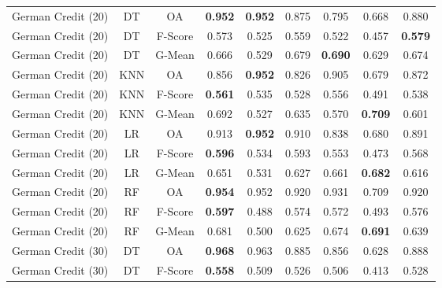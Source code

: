 \begin{longtable}{ccccccccc}
German Credit (20) &         DT &      OA & \textbf{0.952} & \textbf{0.952} &          0.875 &          0.795 &          0.668 &          0.880 \\
German Credit (20) &         DT & F-Score &          0.573 &          0.525 &          0.559 &          0.522 &          0.457 & \textbf{0.579} \\
German Credit (20) &         DT &  G-Mean &          0.666 &          0.529 &          0.679 & \textbf{0.690} &          0.629 &          0.674 \\
German Credit (20) &        KNN &      OA &          0.856 & \textbf{0.952} &          0.826 &          0.905 &          0.679 &          0.872 \\
German Credit (20) &        KNN & F-Score & \textbf{0.561} &          0.535 &          0.528 &          0.556 &          0.491 &          0.538 \\
German Credit (20) &        KNN &  G-Mean &          0.692 &          0.527 &          0.635 &          0.570 & \textbf{0.709} &          0.601 \\
German Credit (20) &         LR &      OA &          0.913 & \textbf{0.952} &          0.910 &          0.838 &          0.680 &          0.891 \\
German Credit (20) &         LR & F-Score & \textbf{0.596} &          0.534 &          0.593 &          0.553 &          0.473 &          0.568 \\
German Credit (20) &         LR &  G-Mean &          0.651 &          0.531 &          0.627 &          0.661 & \textbf{0.682} &          0.616 \\
German Credit (20) &         RF &      OA & \textbf{0.954} &          0.952 &          0.920 &          0.931 &          0.709 &          0.920 \\
German Credit (20) &         RF & F-Score & \textbf{0.597} &          0.488 &          0.574 &          0.572 &          0.493 &          0.576 \\
German Credit (20) &         RF &  G-Mean &          0.681 &          0.500 &          0.625 &          0.674 & \textbf{0.691} &          0.639 \\
German Credit (30) &         DT &      OA & \textbf{0.968} &          0.963 &          0.885 &          0.856 &          0.628 &          0.888 \\
German Credit (30) &         DT & F-Score & \textbf{0.558} &          0.509 &          0.526 &          0.506 &          0.413 &          0.528 \\

\end{longtable}
